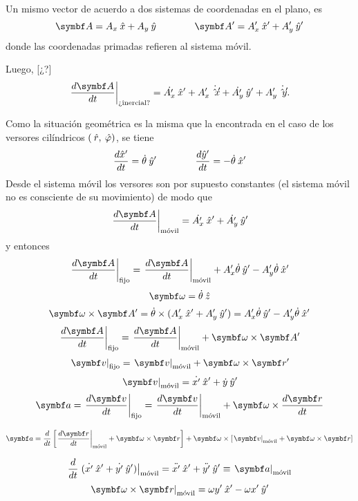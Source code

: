 \documentclass[10pt,oneside]{CBFT_book}
\begin{document}
Un mismo vector de acuerdo a dos sistemas de coordenadas en el plano, es
\[
	\vb{A} = A_x\xver + A_y\yver         \qquad\qquad               \vb{A}' = A_x'\xver' + A_y'\yver'
\]
donde las coordenadas primadas refieren al sistema móvil.

Luego, [¿?]
\[
	\left. \dtot{\vb{A}}{t} \right|_\text{¿inercial?} = 
	\dot{A_x'} \xver' + A_x'\dot{\xver'} + \dot{A_y'}\yver' + A_y' \dot{\yver'}.
\]

Como la situación geométrica es la misma que la encontrada en el caso de los versores cilíndricos $(\:\hat{r},\:\hat{\varphi})$, se tiene 
\[
	\frac{d^{\hspace{-0.05em}} {\hat{x}'}}{d {t}^{\hspace{-0.05em}}} = \dot{\theta} \:\hat{y}'         \qquad \qquad          \frac{d^{\hspace{-0.05em}} {\hat{y}'}}{d {t}^{\hspace{-0.05em}}} = -\dot{\theta} \:\hat{x}'
\]
Desde el sistema móvil los versores son por supuesto constantes (el sistema móvil no es consciente de su movimiento) de modo 
que 
\[
	\left. \dtot{\vb{A}}{t} \right|_\text{móvil} = \dot{A_x'}\xver' + \dot{A_y'}\yver'
\]
y entonces
\[
	\left. \dtot{\vb{A}}{t} \right|_\text{fijo} = \left. \dtot{\vb{A}}{t} \right|_\text{móvil}
	+ A_x' \dot{\theta}\yver' - A_y'\dot{\theta}\xver'
\]
\[
	\vb{\omega} = \dot{\theta} \zver
\]
\[
	\vb{\omega}\times\vb{A}' = \dot{\theta} \times ({A_x'}\xver' + {A_y'}\yver') =
	A_x' \dot{\theta}\yver' - A_y'\dot{\theta}\xver'
\]
\[
	\left. \dtot{\vb{A}}{t} \right|_\text{fijo} = \left. \dtot{\vb{A}}{t} \right|_\text{móvil}
	+ \vb{\omega} \times \vb{A}'
\]
\[
	\left. \vb{v} \right|_\text{fijo} = \left. \vb{v} \right|_\text{móvil} + \vb{\omega} \times \vb{r}'
\]
\[
	\left. \vb{v} \right|_\text{móvil} = \dot{x'}\xver' + \dot{y}\yver' 
\]
\[
	\vb{a} = \left. \dtot{\vb{v}}{t} \right|_\text{fijo} = \left. \dtot{\vb{v}}{t} \right|_\text{móvil} +
	\vb{\omega} \times \dtot{\vb{r}}{t}
\]

\[
	\vb{a} = \dtot{}{t}\left[ \left. \dtot{\vb{r}}{t} \right|_\text{móvil} + \vb{\omega}\times\vb{r} \right] +
	\vb{\omega} \times \left[ \left. \vb{v} \right|_\text{móvil} +	\vb{\omega}\times\vb{r} \right]
\]

\[
	\dtot{}{t}\left.( \dot{x'}\xver' + \dot{y'}\yver' )\right|_\text{móvil} = 
	\ddot{x'}\xver' + \ddot{y'}\yver' \equiv \left. \vb{a} \right|_\text{móvil}
\]
\[
	\left.\vb{\omega}\times\vb{r}\right|_\text{móvil} = \omega y' \xver' - \omega x' \yver'
\]
\end{document}
